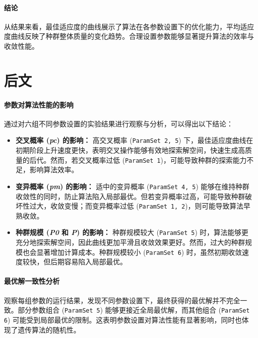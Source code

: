 \documentclass[journal,twoside,web]{ieeecolor}
\begin{document}
\paragraph{结论}
从结果来看，最佳适应度的曲线展示了算法在各参数设置下的优化能力，平均适应度曲线反映了种群整体质量的变化趋势。合理设置参数能够显著提升算法的效率与收敛性能。
\section{后文}
\paragraph{参数对算法性能的影响}
通过对六组不同参数设置的实验结果进行观察与分析，可以得出以下结论：
\begin{itemize}
    \item \textbf{交叉概率 (\textit{pc}) 的影响：}  
    高交叉概率 (\texttt{ParamSet 2, 5}) 下，最佳适应度曲线在初期阶段上升速度更快，表明交叉操作能够有效地探索解空间，快速生成高质量的后代。然而，若交叉概率过低 (\texttt{ParamSet 1})，可能导致种群的探索能力不足，影响算法效率。
    
    \item \textbf{变异概率 (\textit{pm}) 的影响：}  
    适中的变异概率 (\texttt{ParamSet 4, 5}) 能够在维持种群收敛性的同时，防止算法陷入局部最优。但若变异概率过高，可能导致种群破坏性过大，收敛变慢；而变异概率过低 (\texttt{ParamSet 1, 2})，则可能导致算法早熟收敛。
    
    \item \textbf{种群规模 (\textit{P0} 和 \textit{P}) 的影响：}  
    种群规模较大 (\texttt{ParamSet 5}) 时，算法能够更充分地探索解空间，因此曲线更加平滑且收敛效果更好。然而，过大的种群规模也会显著增加计算成本。种群规模较小 (\texttt{ParamSet 6}) 时，虽然初期收敛速度较快，但后期容易陷入局部最优。
\end{itemize}

\paragraph{最优解一致性分析}
观察每组参数的运行结果，发现不同参数设置下，最终获得的最优解并不完全一致。部分参数组合 (\texttt{ParamSet 5}) 能够更接近全局最优解，而其他组合 (\texttt{ParamSet 6}) 可能受到局部最优的限制。这表明参数设置对算法性能有显著影响，同时也体现了遗传算法的随机性。
\end{document}
